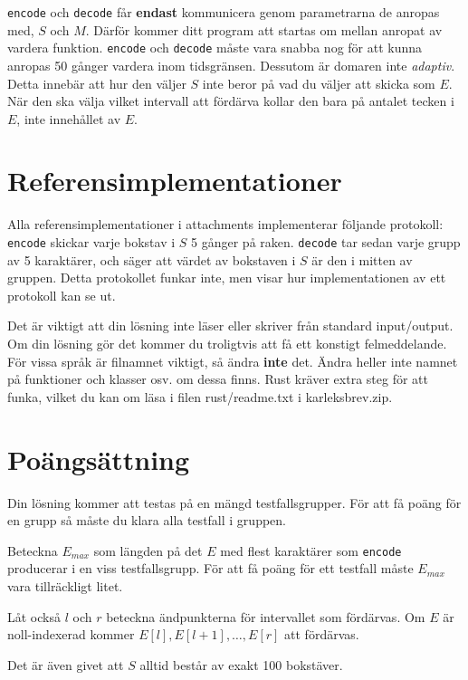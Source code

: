 \texttt{encode} och \texttt{decode} får \textbf{endast} kommunicera genom parametrarna de anropas med, $S$ och $M$.
Därför kommer ditt program att startas om mellan anropat av vardera funktion. \texttt{encode} och \texttt{decode} 
måste vara snabba nog för att kunna anropas 50 gånger vardera inom tidsgränsen. Dessutom är domaren inte \textit{adaptiv}.
Detta innebär att hur den väljer $S$ inte beror på vad du väljer att skicka som $E$. När den ska välja vilket intervall
att fördärva kollar den bara på antalet tecken i $E$, inte innehållet av $E$.

\section*{Referensimplementationer}
Alla referensimplementationer i attachments implementerar följande protokoll: \texttt{encode} skickar varje bokstav
i $S$ 5 gånger på raken. \texttt{decode} tar sedan varje grupp av 5 karaktärer, och säger att värdet av bokstaven
i $S$ är den i mitten av gruppen. Detta protokollet funkar inte, men visar hur implementationen av ett
protokoll kan se ut.

Det är viktigt att din lösning inte läser eller skriver från standard input/output. Om din lösning gör det
kommer du troligtvis att få ett konstigt felmeddelande. För vissa språk är filnamnet viktigt, så ändra \textbf{inte}
det. Ändra heller inte namnet på funktioner och klasser osv. om dessa finns. Rust kräver extra steg för att funka,
vilket du kan om läsa i filen rust/readme.txt i karleksbrev.zip.

\section*{Poängsättning}
Din lösning kommer att testas på en mängd testfallsgrupper.
För att få poäng för en grupp så måste du klara alla testfall i gruppen.

Beteckna $E_{max}$ som längden på det $E$ med flest karaktärer som \texttt{encode} producerar
i en viss testfallsgrupp. För att få poäng för ett testfall måste $E_{max}$ vara tillräckligt litet.

Låt också $l$ och $r$ beteckna ändpunkterna för intervallet som fördärvas. Om $E$ är noll-indexerad kommer
$E[l],E[l+1],\dots,E[r]$ att fördärvas.

Det är även givet att $S$ alltid består av exakt 100 bokstäver.

